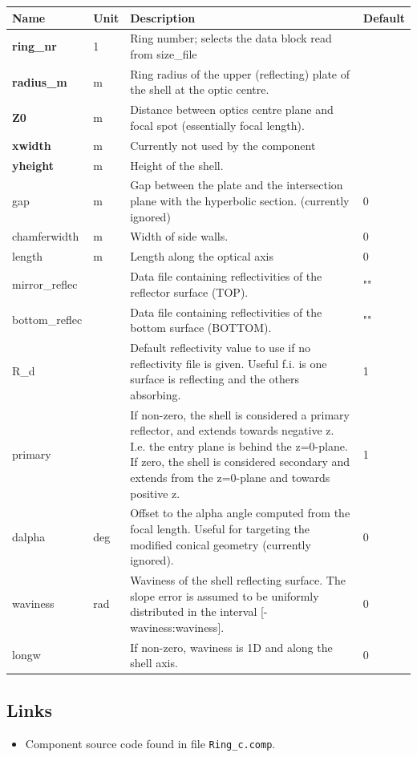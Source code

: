 \begin{longtable}{p{}p{}p{}p{}}
\toprule
\textbf{Name} & \textbf{Unit} & \textbf{Description} & \textbf{Default} \\
\midrule
\endhead
\textbf{ring\_nr} & 1 & Ring number; selects the data block read from size\_file &  \\
\textbf{radius\_m} & m & Ring radius of the upper (reflecting) plate of the shell at the optic centre. &  \\
\textbf{Z0} & m & Distance between optics centre plane and focal spot (essentially focal length). &  \\
\textbf{xwidth} & m & Currently not used by the component &  \\
\textbf{yheight} & m & Height of the shell. &  \\
gap & m & Gap between the plate and the intersection plane with the hyperbolic section. (currently ignored) & 0 \\
chamferwidth & m & Width of side walls. & 0 \\
length & m & Length along the optical axis & 0 \\
mirror\_reflec &   & Data file containing reflectivities of the reflector surface (TOP). & "" \\
bottom\_reflec &   & Data file containing reflectivities of the bottom surface (BOTTOM). & "" \\
R\_d &   & Default reflectivity value to use if no reflectivity file is given. Useful f.i. is one surface is reflecting and the others absorbing. & 1 \\
primary &   & If non-zero, the shell is considered a primary reflector, and extends towards negative z. I.e. the entry plane is behind the z=0-plane. If zero, the shell is considered secondary and extends from the z=0-plane and towards positive z. & 1 \\
dalpha & deg & Offset to the alpha angle computed from the focal length. Useful for targeting the modified conical geometry (currently ignored). & 0 \\
waviness & rad & Waviness of the shell reflecting surface. The slope error is assumed to be uniformly distributed in the interval [-waviness:waviness]. & 0 \\
longw &   & If non-zero, waviness is 1D and along the shell axis. & 0 \\
\bottomrule
\end{longtable}

\subsection*{Links}
\begin{itemize}
  \item Component source code found in file \texttt{Ring\_c.comp}.
\end{itemize}

